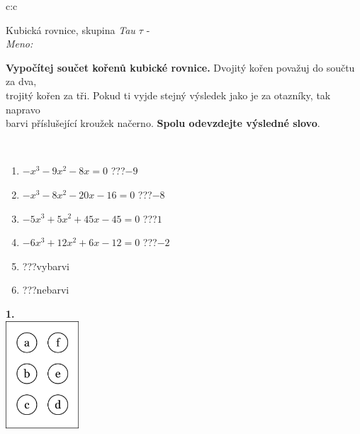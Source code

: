 \documentclass[10pt]{report}
\begin{document}
\begin{tabular}{c:c}
\begin{minipage}[c][104.5mm][t]{0.5\linewidth}
\begin{center}
\vspace{7mm}
{\huge Kubická rovnice, skupina \textit{Tau $\tau$} -}\\[5mm]
\textit{Meno:}\phantom{xxxxxxxxxxxxxxxxxxxxxxxxxxxxxxxxxxxxxxxxxxxxxxxxxxxxxxxxxxxxxxxxx}\\[5mm]
\begin{minipage}{0.95\linewidth}
\textbf{Vypočítej součet kořenů kubické rovnice.} Dvojitý kořen považuj do součtu za dva,\\trojitý kořen za tři. Pokud ti vyjde stejný výsledek jako je za otazníky, tak napravo\\barvi příslušející kroužek načerno. \textbf{Spolu odevzdejte výsledné slovo}.
\end{minipage}
\\[1mm]
\begin{minipage}{0.79\linewidth}
\begin{center}
\begin{varwidth}{\linewidth}
\begin{enumerate}
\Large
\item $-x^3-9x^2-8x=0$\quad \dotfill\; ???\;\dotfill \quad $-9$
\item $-x^3-8x^2-20x-16=0$\quad \dotfill\; ???\;\dotfill \quad $-8$
\item $-5x^3+5x^2+45x-45=0$\quad \dotfill\; ???\;\dotfill \quad $1$
\item $-6x^3+12x^2+6x-12=0$\quad \dotfill\; ???\;\dotfill \quad $-2$
\item \quad \dotfill\; ???\;\dotfill \quad vybarvi
\item \quad \dotfill\; ???\;\dotfill \quad nebarvi
\end{enumerate}
\end{varwidth}
\end{center}
\end{minipage}
\begin{minipage}{0.20\linewidth}
\begin{center}
{\Huge\bfseries 1.} \\[2mm]
\includegraphics[height=40mm]{../images/braille.png}

\end{center}
\end{minipage}
\end{center}
\end{minipage}
\end{tabular}
\end{document}

